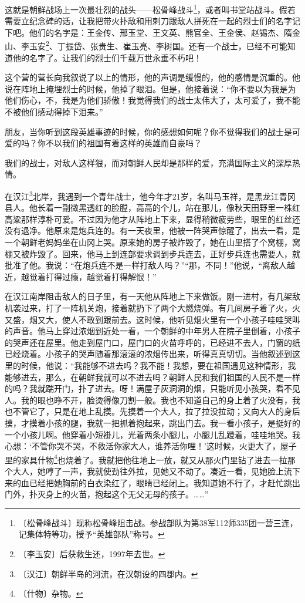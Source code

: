 \documentclass[12pt,UTF-8,openany]{ctexbook}
\begin{document}
\begin{large}
    这就是朝鲜战场上一次最壮烈的战头——松骨峰战斗\footnote{〔松骨峰战斗〕现称松骨峰阻击战。参战部队为第38军112师335团一营三连，记集体特等功，授予“英雄部队”称号。}，或者叫书堂站战斗。假若需要立纪念碑的话，让我把带火扑敌和用刺刀跟敌人拼死在一起的烈士们的名字记下吧。他们的名字是：王金传、邢玉堂、王文英、熊官全、王金侯、赵锡杰、隋金山、李玉安\footnote{〔李玉安〕后获救生还，1997年去世。}、丁振岱、张贵生、崔玉亮、李树国。还有一个战士，已经不可能知道他的名字了。让我们的烈士们千载万世永垂不朽吧！
    
    这个营的营长向我叙说了以上的情形，他的声调是缓慢的，他的感情是沉重的。他说在阵地上掩埋烈士的时候，他掉了眼泪。但是，他接着说：“你不要以为我是为他们伤心，不，我是为他们骄傲！我觉得我们的战士太伟大了，太可爱了，我不能不被他们感动得掉下泪来。”
    
    朋友，当你听到这段英雄事迹的时候，你的感想如何呢？你不觉得我们的战士是可爱的吗？你不以我们的祖国有着这样的英雄而自豪吗？
    
    我们的战士，对敌人这样狠，而对朝鲜人民却是那样的爱，充满国际主义的深厚热情。
    
    在汉江\footnote{〔汉江〕朝鲜半岛的河流，在汉朝设的四郡内。}北岸，我遇到一个青年战士，他今年才21岁，名叫马玉祥，是黑龙江青冈县人。他长着一副微黑透红的脸膛，高高的个儿，站在那儿，像秋天田野里一株红高粱那样淳朴可爱。不过因为他才从阵地上下来，显得稍微疲劳些，眼里的红丝还没有退净。他原来是炮兵连的。有一天夜里，他被一阵哭声惊醒了，出去一看，是一个朝鲜老妈妈坐在山冈上哭。原来她的房子被炸毁了，她在山里搭了个窝棚，窝棚又被炸毁了。回来，他马上到连部要求调到步兵连去，正好步兵连也需要人，就批准了他。我说：“在炮兵连不是一样打敌人吗？”“那，不同！”他说，“离敌人越近，越觉着打得过瘾，越觉着打得解恨！”
    
    在汉江南岸阻击敌人的日子里，有一天他从阵地上下来做饭。刚一进村，有几架敌机袭过来，打了一阵机关炮，接着就扔下了两个大燃烧弹。有几间房子着了火，火又盛，烟又大，使人不敢到跟前去。这时候，他听见烟火里有一个小孩子哇哇哭叫的声音。他马上穿过浓烟到近处一看，一个朝鲜的中年男人在院子里倒着，小孩子的哭声还在屋里。他走到屋门口，屋门口的火苗呼呼的，已经进不去人，门窗的纸已经烧着。小孩子的哭声随着那滚滚的浓烟传出来，听得真真切切。当他叙述到这里的时候，他说：“我能够不进去吗？我不能！我想，要在祖国遇见这种情形，我能够进去，那么，在朝鲜我就可以不进去吗？朝鲜人民和我们祖国的人民不是一样的吗？我就踹开门，扑了进去。呀！满屋子灰洞洞的烟，只能听见小孩哭，看不见人。我的眼也睁不开，脸烫得像刀割一般。我也不知道自己的身上着了火没有，我也不管它了，只是在地上乱摸。先摸着一个大人，拉了拉没拉动；又向大人的身后摸，才摸着小孩的腿，我就一把抓着抱起来，跳出门去。我一看小孩子，是挺好的一个小孩儿啊。他穿着小短褂儿，光着两条小腿儿，小腿儿乱蹬着，哇哇地哭。我心想：‘不管你哭不哭，不救活你家大人，谁养活你哩！’这时候，火更大了，屋子里的家具什物\footnote{〔什物〕杂物。}也烧着了。我就把他往地上一放，就又从那火门里钻了进去一拉那个大人，她哼了一声，我就使劲往外拉，见她又不动了。凑近一看，见她脸上流下来的血已经把她胸前的白衣染红了，眼睛已经闭上。我知道她不行了，才赶忙跳出门外，扑灭身上的火苗，抱起这个无父无母的孩子。……”
    

\end{large}
\end{document}

